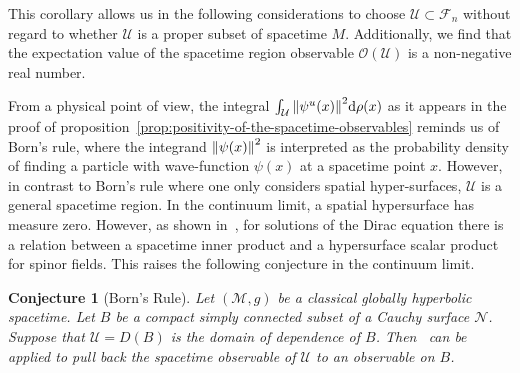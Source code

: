 \documentclass[reqno,11pt]{amsart}
\newcommand{\F}{{\mathcal{F}}}
\newtheorem{conjecture}[definition]{Conjecture}
\numberwithin{equation}{section}
\begin{document}
This corollary allows us in the following considerations to choose $\mathcal{U} \subset {\F_n}$ without regard to whether
$\mathcal{U}$ is a proper subset of spacetime $M$.
Additionally, we find that the expectation value of the spacetime region observable $\mathcal{O}(\mathcal{U})$ is a non-negative
real number.

From a physical point of view, the integral $\int_\mathcal{U} \norm{\psi^{u}(x)}^2 \dd \rho(x)$ as it appears in the proof
of proposition~\ref{prop:positivity-of-the-spacetime-observables} reminds us of Born's rule, where the integrand
$\norm{\psi(x)}^2$ is interpreted as the probability density of finding a particle with wave-function $\psi(x)$ at a spacetime point $x$.
However, in contrast to Born's rule where one only considers spatial hyper-surfaces, $\mathcal{U}$ is a general spacetime region.
In the continuum limit, a spatial hypersurface has measure zero.
However, as shown in~\cite{finster2013non}, for solutions of the Dirac equation there is a relation between a spacetime inner product and a hypersurface scalar
product for spinor fields.
This raises the following conjecture in the continuum limit.

\begin{conjecture}[Born's Rule]
    Let $(\mathcal{M}, g)$ be a classical globally hyperbolic spacetime.
    Let $B$ be a compact simply connected subset of a Cauchy surface $\mathcal{N}$.
    Suppose that $\mathcal{U} = D(B)$ is the domain of dependence of $B$.
    Then~\cite[Proposition 3.1. ]{finster2013non} can be applied to pull back the spacetime observable of $\mathcal{U}$ to an observable on $B$.
\end{conjecture}
\end{document}
